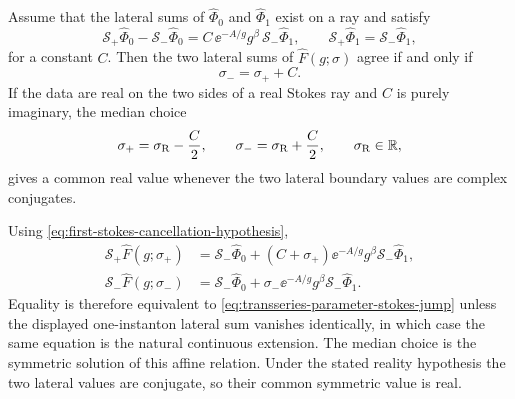 \begin{remark}
\label{rem:first-stokes-cancellation-algebra}
Assume that the lateral sums of \(\widehat\Phi_0\) and \(\widehat\Phi_1\)
exist on a ray and satisfy
\begin{equation}
  \mathcal S_{+}\widehat\Phi_0
  -
  \mathcal S_{-}\widehat\Phi_0
  =
  C\,\ee^{-A/g}g^\beta\,\mathcal S_{-}\widehat\Phi_1,
  \qquad
  \mathcal S_{+}\widehat\Phi_1=\mathcal S_{-}\widehat\Phi_1,
  \label{eq:first-stokes-cancellation-hypothesis}
\end{equation}
for a constant \(C\).  Then the two lateral sums of
\(\widehat F(g;\sigma)\) agree if and only if
\begin{equation}
  \sigma_-=\sigma_+ + C .
  \label{eq:transseries-parameter-stokes-jump}
\end{equation}
If the data are real on the two sides of a real Stokes ray and \(C\) is purely
imaginary, the median choice
\begin{equation}
  \sigma_+=\sigma_{\rm R}-\frac{C}{2},
  \qquad
  \sigma_-=\sigma_{\rm R}+\frac{C}{2},
  \qquad
  \sigma_{\rm R}\in\mathbb R,
  \label{eq:median-transseries-parameter}
\end{equation}
gives a common real value whenever the two lateral boundary values are complex
conjugates.
\par
Using \eqref{eq:first-stokes-cancellation-hypothesis},
\[
\begin{aligned}
  \mathcal S_{+}\widehat F(g;\sigma_+)
  &=
  \mathcal S_{-}\widehat\Phi_0
  +(C+\sigma_+)\ee^{-A/g}g^\beta\mathcal S_{-}\widehat\Phi_1,\\
  \mathcal S_{-}\widehat F(g;\sigma_-)
  &=
  \mathcal S_{-}\widehat\Phi_0
  +\sigma_-\ee^{-A/g}g^\beta\mathcal S_{-}\widehat\Phi_1.
\end{aligned}
\]
Equality is therefore equivalent to \eqref{eq:transseries-parameter-stokes-jump}
unless the displayed one-instanton lateral sum vanishes identically, in which
case the same equation is the natural continuous extension.  The median
choice is the symmetric solution of this affine relation.  Under the stated
reality hypothesis the two lateral values are conjugate, so their common
symmetric value is real.
\end{remark}

